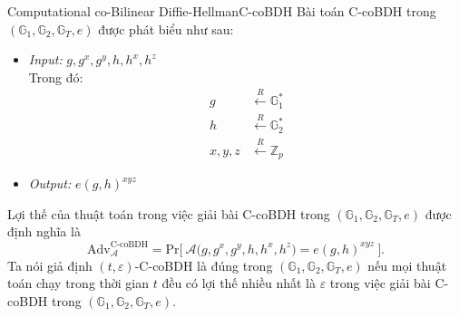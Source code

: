 \documentclass[class=report, crop=false]{standalone}
\begin{document}
			\begin{problem}{Computational co-Bilinear Diffie-Hellman}{C-coBDH}
				Bài toán C-coBDH trong $(\mathbb{G}_1, \mathbb{G}_2, \mathbb{G}_T, e)$ được phát biểu như sau:
				\vspace{-\baselineskip}
				\begin{itemize}[leftmargin=1.5cm, itemindent=-0.5cm]
					\item[] \textit{Input:} $g, g^x, g^y, h, h^x, h^z$ \\
					Trong đó: \vspace{-\baselineskip}
					\begin{align*}
						g 			&\xleftarrow{R} \mathbb{G}_1^* \\
						h 			&\xleftarrow{R} \mathbb{G}_2^* \\
						x, y, z 	&\xleftarrow{R} \mathbb{Z}_p
					\end{align*}
					\item[] \textit{Output:} $e(g, h)^{xyz}$
				\end{itemize}
				\vspace{-\baselineskip}\par
				Lợi thế của thuật toán \algo trong việc giải bài C-coBDH trong $(\mathbb{G}_1, \mathbb{G}_2, \mathbb{G}_T, e)$ được định nghĩa là
				\[
					\text{Adv}_{\mathcal{A}}^{\text{C-coBDH}} = \text{Pr}\bigg[ \ \mathcal{A}\Big(g, g^x, g^y, h, h^x, h^z \Big) = e(g, h)^{xyz} \ \bigg].
				\] \indent
				Ta nói giả định $(t, \varepsilon)$-C-coBDH là đúng trong $(\mathbb{G}_1, \mathbb{G}_2, \mathbb{G}_T, e)$ nếu mọi thuật toán chạy trong thời gian $t$ đều có lợi thế nhiều nhất là $\varepsilon$ trong việc giải bài C-coBDH trong $(\mathbb{G}_1, \mathbb{G}_2, \mathbb{G}_T, e)$.
			\end{problem}
\end{document}
